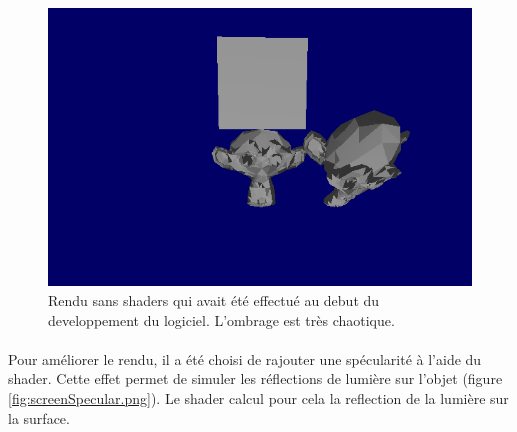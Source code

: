 \begin{figure}[h!]
	\centering
	\includegraphics[scale=0.5]{images/rendu_sans_shader.png}
	\caption{\label{fig:screenRenduSansShader.png} Rendu sans shaders qui avait été effectué au debut du developpement du logiciel. L'ombrage est très chaotique. \protect}
\end{figure}

\paragraph{}
Pour améliorer le rendu, il a été choisi de rajouter une spécularité à l'aide du shader. Cette effet permet de simuler les réflections de lumière sur l'objet (figure \ref{fig:screenSpecular.png}). Le shader calcul pour cela la reflection de la lumière sur la surface.


